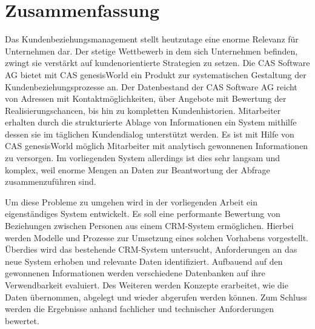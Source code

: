 
\chapter*{\centering Zusammenfassung}



Das Kundenbeziehungsmanagement stellt heutzutage eine enorme Relevanz für Unternehmen dar. Der stetige Wettbewerb in dem sich Unternehmen
befinden, zwingt sie verstärkt auf kundenorientierte Strategien zu setzen. Die CAS Software AG bietet mit CAS genesisWorld ein Produkt zur systematischen Gestaltung der Kundenbeziehungsprozesse an. Der Datenbestand der CAS Software AG reicht von Adressen mit Kontaktmöglichkeiten, über Angebote mit Bewertung der Realisierungschancen, bis hin zu kompletten Kundenhistorien. Mitarbeiter erhalten durch die strukturierte Ablage von Informationen ein System mithilfe dessen sie im täglichen Kundendialog unterstützt werden. Es ist mit Hilfe von CAS genesisWorld möglich Mitarbeiter mit analytisch gewonnenen Informationen zu versorgen. Im vorliegenden System allerdings ist dies sehr langsam und komplex, weil enorme Mengen an Daten zur Beantwortung der Abfrage zusammenzuführen sind.       

Um diese Probleme zu umgehen wird in der vorliegenden Arbeit ein eigenständiges System entwickelt. Es soll eine performante Bewertung von Beziehungen zwischen Personen aus einem CRM-System ermöglichen. Hierbei werden Modelle und Prozesse zur Umsetzung eines solchen Vorhabens vorgestellt. Überdies wird das bestehende CRM-System untersucht, Anforderungen an das neue System erhoben und relevante Daten identifiziert. Aufbauend auf den gewonnenen Informationen werden verschiedene Datenbanken auf ihre Verwendbarkeit evaluiert. Des Weiteren werden Konzepte erarbeitet, wie die Daten übernommen, abgelegt und wieder abgerufen werden können. Zum Schluss werden die Ergebnisse anhand fachlicher und technischer Anforderungen bewertet.